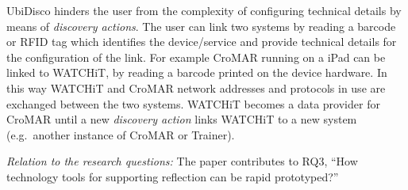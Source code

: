 UbiDisco hinders the user from the complexity of configuring technical details by means of \emph{discovery actions}. The user can link two systems by reading a barcode or RFID tag which identifies the device/service and provide technical details for the configuration of the link. For example CroMAR running on a iPad can be linked to WATCHiT, by reading a barcode printed on the device hardware. In this way WATCHiT and CroMAR network addresses and protocols in use are exchanged between the two systems. WATCHiT becomes a data provider for CroMAR until a new \emph{discovery action} links WATCHiT to a new system (e.g.~another instance of CroMAR or Trainer).

\emph{Relation to the research questions: } The paper contributes to RQ3, ``How technology tools for supporting reflection can be rapid prototyped?'' 
